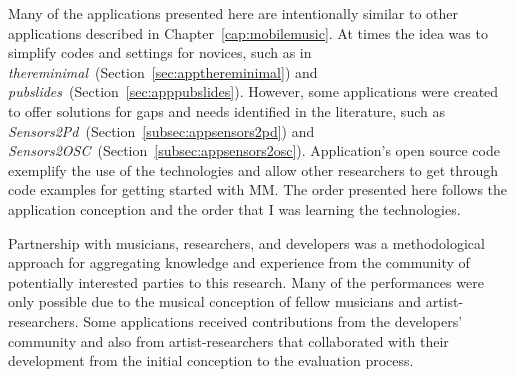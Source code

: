


Many of the applications presented here are intentionally similar to other applications described in Chapter~\ref{cap:mobilemusic}. 
At times the idea was to simplify codes and settings for novices, such as in \textit{thereminimal}~(Section~\ref{sec:appthereminimal}) and \textit{pubslides}~(Section~\ref{sec:apppubslides}).
However, some applications were created to offer solutions for gaps and needs identified in the literature, such as \textit{Sensors2Pd}~(Section~\ref{subsec:appsensors2pd}) and \textit{Sensors2OSC}~(Section~\ref{subsec:appsensors2osc}).
Application's open source code exemplify the use of the technologies and allow other researchers to get through code examples for getting started with MM.
The order presented here follows the application conception and the order that I was learning the technologies.

Partnership with musicians, researchers, and developers was a methodological approach for aggregating knowledge and experience from the community of potentially interested parties to this research.
Many of the performances were only possible due to the musical conception of fellow musicians and artist-researchers.
Some applications received contributions from the developers' community and also from artist-researchers that collaborated with their development from the initial conception to the evaluation process.

